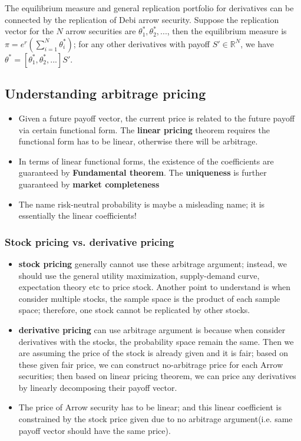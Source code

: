\documentclass[a4paper,13pt]{report}
\newcommand{\R}{\mathbb{R}}
\begin{document}
The equilibrium measure and general replication portfolio for derivatives can be connected by the replication of Debi arrow security. Suppose the replication vector for the $N$ arrow securities are $\theta^*_1,\theta^*_2,...$, then the equilibrium measure is $\pi = e^r (\sum_{i=1}^N \theta^*_i)$; for any other derivatives with payoff $S'\in \R^N$, we have $\theta^* = [\theta^*_1,\theta^*_2,...] S'$.

\subsection{Understanding arbitrage pricing}
\begin{itemize}
    \item Given a future payoff vector, the current price is related to the future payoff via certain functional form. The \textbf{linear pricing} theorem requires the functional form has to be linear, otherwise there will be arbitrage. 
    \item In terms of linear functional forms, the existence of the coefficients are guaranteed by \textbf{Fundamental theorem}. The \textbf{uniqueness} is further guaranteed by \textbf{market completeness}
    \item The name risk-neutral probability is maybe a misleading name; it is essentially the linear coefficients!
\end{itemize}

  



\subsubsection{Stock pricing vs. derivative pricing}
\begin{itemize}
    \item \textbf{stock pricing} generally cannot use these arbitrage argument; instead, we should use the general utility maximization, supply-demand curve, expectation theory etc to price stock. Another point to understand is when consider multiple stocks, the sample space is the product of each sample space; therefore, one stock cannot be replicated by other stocks.
    \item \textbf{derivative pricing} can use arbitrage argument is because when consider derivatives with the stocks, the probability space remain the same. Then we are assuming the price of the stock is already given and it is fair; based on these given fair price, we can construct no-arbitrage price for each Arrow securities; then based on linear pricing theorem, we can price any derivatives by linearly decomposing their payoff vector. 
    \item The price of Arrow security has to be linear; and this linear coefficient is constrained by the stock price given due to no arbitrage argument(i.e. same payoff vector should have the same price). 
\end{itemize}
\end{document}
